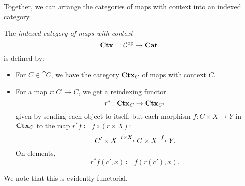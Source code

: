 \documentclass[DynamicalBook]{subfiles}
\begin{document}
Together, we can arrange the categories of maps with context into
an indexed category.
\begin{definition}
  The \emph{indexed category of maps with context}
  $$\textbf{Ctx}_{-} : \mathcal{C}^{\textnormal{op}} \to \textbf{Cat}$$
  is defined by:
  \begin{itemize}
    \item For $C \in \cat{C}$, we have the category $\textbf{Ctx}_{C}$ of maps with
      context $C$.
    \item For a map $r : C' \to C$, we get a reindexing functor
      $$r^{\ast} : \textbf{Ctx}_{C} \to \textbf{Ctx}_{C'}$$
      given by sending each object to itself, but each morphism $f : C \times X
      \to Y$ in $\textbf{Ctx}_{C}$ to the map $r^{\ast}f \coloneqq f \circ (r \times X)$:
      $$C' \times X \xrightarrow{r \times X} C \times X \xrightarrow{f} Y.$$
      On elements,
      $$r^{\ast}f(c', x) \coloneqq f(r(c'), x).$$
  \end{itemize}
  We note that this is evidently functorial.
\end{definition}
\end{document}
